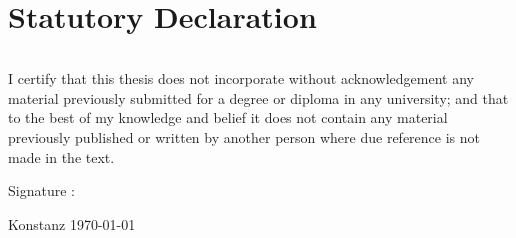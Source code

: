 \section*{ Statutory Declaration  }
\thispagestyle{empty}

\begin{verbatim}

\end{verbatim}



I certify that this thesis does not incorporate without acknowledgement any material
previously submitted for a degree or diploma in any university; and that to the best of
my knowledge and belief it does not contain any material previously published or written
by another person where due reference is not made in the text.


\begin{flushleft}
Signature :

\end{flushleft}

 
\begin{flushright}
Konstanz \today

\end{flushright} 
 